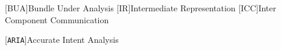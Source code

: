 [BUA]{Bundle Under Analysis}
[IR]{Intermediate Representation}
[ICC]{Inter Component Communication}


\def\HiLi{\leavevmode\rlap{\hbox to \hsize{\color{yellow!50}\leaders\hrule height .8\baselineskip depth .5ex\hfill}}}

[\texttt{ARIA}]{Accurate Intent Analysis}
\newcommand{\attr}[1]{\textsc{#1}}

\setcounter{cnt}{0}
\def\rqseq{\addtocounter{cnt}{1}\arabic{cnt}}
\newcommand{\RQ}[1]{RQ \rqseq: #1}

\newcommand{\rqa}{How do developers use Android methods for Intent-based \acp{icc}?}

\newcommand{\rqb}{How Intents are constructed?}

\newcommand{\rqc}{How Intents are used?}




\newcommand{\totalbenignapps}{1376}
\newcommand{\totalmalapps}{745}
\newcommand{\totaliccmethods}{700}
\newcommand{\totalapis}{578}
\newcommand{\totalcallbacks}{122}

